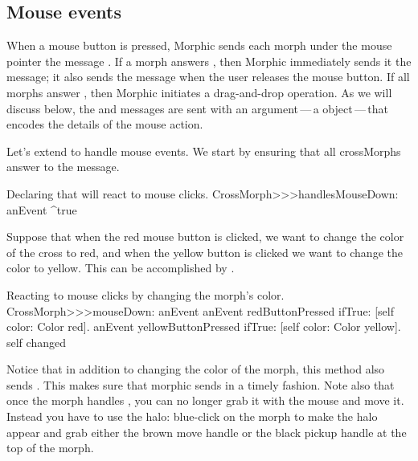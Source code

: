\documentclass[a4paper,10pt,twoside]{book}
\begin{document}
\subsection{Mouse events}

When a mouse button is pressed, Morphic sends each morph under the mouse pointer the message . If a morph answers , then Morphic immediately sends it the  message; it also sends the  message when the user releases the mouse button.
If all morphs answer , then Morphic initiates a drag-and-drop operation.
As we will discuss below, the  and  messages are sent with an argument\,---\,a  object\,---\,that encodes the details of the mouse action.

Let's extend  to handle mouse events.  
We start by ensuring that all crossMorphs answer  to the  message. 

\begin{method}{Declaring that  will react to mouse clicks.}
CrossMorph>>>handlesMouseDown: anEvent
	^true
\end{method}

Suppose that when the red mouse button is clicked, we want to change the color of the cross to red, and when the yellow button is clicked we want to change the color to yellow.
This can be accomplished by .

\begin{method}[mouseDown]{Reacting to mouse clicks by changing the morph's color.}
CrossMorph>>>mouseDown: anEvent
	anEvent redButtonPressed
		ifTrue: [self color: Color red].
	anEvent yellowButtonPressed
		ifTrue: [self color: Color yellow].
	self changed
\end{method}

Notice that in addition to changing the color of the morph, this method also sends .
This makes sure that morphic sends  in a timely fashion.
Note also that once the morph handles , you can no longer grab it with the mouse and move it.
Instead you have to use the halo: blue-click on the morph to make the halo appear and grab either the brown move handle \moveHandle{} or the black pickup handle \grabHandle{} at the top of the morph.
\end{document}
